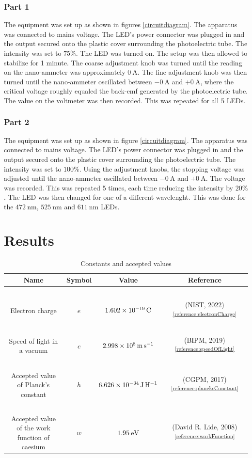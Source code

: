 \documentclass{article}[12pt]
\newcommand{\reference}[3]{(#2, #3)\textsuperscript{\ref{#1}}} %
\newcommand{\thline}{\hline ~ & ~ & ~ & ~ \\[-2ex] }
\begin{document}
            \subsubsection{Part 1}
                The equipment was set up as shown in figures \ref{circuitdiagram}. The apparatus was connected to mains voltage. The LED's power connector was plugged in and the output secured onto the plastic cover surrounding the photoelectric tube. The intensity was set to $75\%$. The LED was turned on. The setup was then allowed to stabilize for 1 minute. The coarse adjustment knob was turned until the reading on the nano-ammeter was approximately $\qty{0}{\A}$. The fine adjustment knob was then turned until the nano-ammeter oscillated between $-\qty{0}{\A}$ and $+\qty{0}{\A}$, where the critical voltage roughly equaled the back-emf generated by the photoelectric tube. The value on the voltmeter was then recorded. This was repeated for all 5 LEDs.

            \subsubsection{Part 2}
                The equipment was set up as shown in figure \ref{circuitdiagram}. The apparatus was connected to mains voltage. The LED's power connector was plugged in and the output secured onto the plastic cover surrounding the photoelectric tube. The intensity was set to $100\%$. Using the adjustment knobs, the stopping voltage was adjusted until the nano-ammeter oscillated between $-\qty{0}{\A}$ and $+\qty{0}{\A}$. The voltage was recorded. This was repeated 5 times, each time reducing the intensity by $20\%$. The LED was then changed for one of a different wavelenght. This was done for the $\qty{472}{\nm}$, $\qty{525}{\nm}$ and $\qty{611}{\nm}$ LEDs.
    \FloatBarrier
    \newpage
    \section{Results}
        \begin{table}[!ht]
            \centering
            \begin{tabular}[center]{|c|c|c|c|}
                \hline
                Name & Symbol & Value & Reference \\
                \thline
                Electron charge & $e$ & $\qty{1.602E-19}{\C}$ & \reference{reference:electronCharge}{NIST}{2022} \\
                \thline
                Speed of light in a vacuum & $c$ & $\qty{2.998E8}{\m\per\s}$ & \reference{reference:speedOfLight}{BIPM}{2019} \\
                \thline
                Accepted value of Planck's constant & $h$ & $\qty{6.626E-34}{\J\per\H}$ & \reference{reference:plancksConstant}{CGPM}{2017} \\
                \thline 
                Accepted value of the work function of caesium & $w$ & $\qty{1.95}{\eV}$ & \reference{reference:workFunction}{David R. Lide}{2008} \\
                \hline
            \end{tabular}
            \caption{Constants and accepted values}\label{constants}
        \end{table}
        \FloatBarrier
\end{document}
